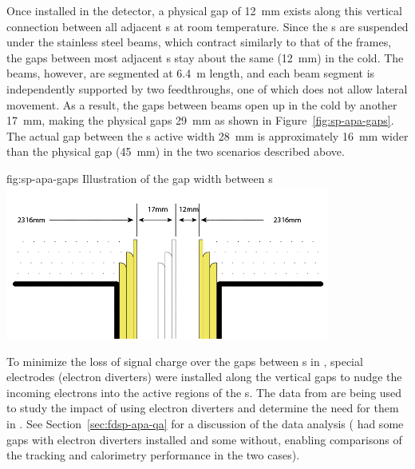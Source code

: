 Once installed in the detector, a physical gap of \SI{12}{mm} exists along this vertical connection between all adjacent s at room temperature. Since the s are suspended under the stainless steel  beams, which contract similarly to that of the  frames, the gaps between most adjacent s stay about the same (\SI{12}{mm}) in the cold.  The  beams, however, are segmented at \SI{6.4}{m} length, and each beam segment is independently supported by two  feedthroughs, one of which does not allow lateral movement.  As a result, the gaps between  beams open up in the cold by another \SI{17}{mm},  %
making the physical gaps \SI{29}{mm} as shown in Figure~\ref{fig:sp-apa-gaps}.  The actual gap between the s active width \SI{28}{mm} is approximately \SI{16}{mm} wider than the physical gap (\SI{45}{mm}) in the two scenarios described above.

\begin{dunefigure}{fig:sp-apa-gaps}
{Illustration of the gap width between s}  
\includegraphics[width=0.8\textwidth]{graphics/sp-apa-gaps.png} 
\end{dunefigure}

 
To minimize the loss of signal charge over the gaps between s in , special electrodes (electron diverters) were installed along the vertical gaps to nudge the incoming electrons into the active regions of the s. The data from  are being used to study the impact of using electron diverters and determine the need for them in .  See Section~\ref{sec:fdsp-apa-qa} for a discussion of the  data analysis ( had some gaps with electron diverters installed and some without, enabling comparisons of the tracking and calorimetry performance in the two cases). %





